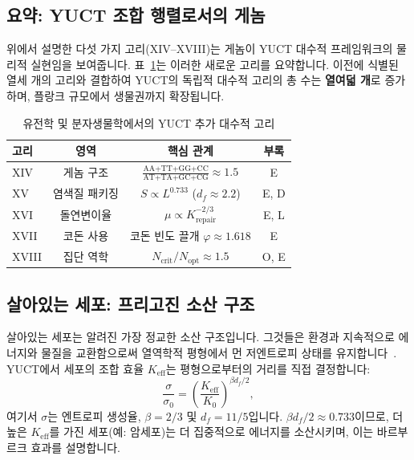 \documentclass[11pt,a4paper]{article}
\newcommand{\Keff}{K_{\mathrm{eff}}}
\begin{document}
	\subsection{요약: YUCT 조합 행렬로서의 게놈}
	
	위에서 설명한 다섯 가지 고리(XIV–XVIII)는 게놈이 YUCT 대수적 프레임워크의 물리적 실현임을 보여줍니다. 표~\ref{tab:genetic-loops}는 이러한 새로운 고리를 요약합니다. 이전에 식별된 열세 개의 고리와 결합하여 YUCT의 독립적 대수적 고리의 총 수는 \textbf{열여덟 개}로 증가하며, 플랑크 규모에서 생물권까지 확장됩니다.
	
	\begin{table}[htbp]
		\centering
		\caption{유전학 및 분자생물학에서의 YUCT 추가 대수적 고리}
		\label{tab:genetic-loops}
		\footnotesize
		\begin{tabular}{l c c c}
			\toprule
			\textbf{고리} & \textbf{영역} & \textbf{핵심 관계} & \textbf{부록} \\
			\midrule
			XIV & 게놈 구조 & \(\frac{\text{AA+TT+GG+CC}}{\text{AT+TA+GC+CG}} \approx 1.5\) & E \\
			XV & 염색질 패키징 & \(S \propto L^{0.733}\) (\(d_f \approx 2.2\)) & E, D \\
			XVI & 돌연변이율 & \(\mu \propto K_{\mathrm{repair}}^{-2/3}\) & E, L \\
			XVII & 코돈 사용 & 코돈 빈도 끌개 \(\varphi \approx 1.618\) & E \\
			XVIII & 집단 역학 & \(N_{\mathrm{crit}}/N_{\mathrm{opt}} \approx 1.5\) & O, E \\
			\bottomrule
		\end{tabular}
	\end{table}
	
	\subsection{살아있는 세포: 프리고진 소산 구조}
	\label{subsec:prigogine}
	
	살아있는 세포는 알려진 가장 정교한 소산 구조입니다. 그것들은 환경과 지속적으로 에너지와 물질을 교환함으로써 열역학적 평형에서 먼 저엔트로피 상태를 유지합니다~\cite{Prigogine1977}. YUCT에서 세포의 조합 효율 \(\Keff\)는 평형으로부터의 거리를 직접 결정합니다:
	\begin{equation}
		\frac{\sigma}{\sigma_0} = \left( \frac{\Keff}{K_0} \right)^{\beta d_f / 2},
	\end{equation}
	여기서 \(\sigma\)는 엔트로피 생성율, \(\beta=2/3\) 및 \(d_f=11/5\)입니다. \(\beta d_f / 2 \approx 0.733\)이므로, 더 높은 \(\Keff\)를 가진 세포(예: 암세포)는 더 집중적으로 에너지를 소산시키며, 이는 바르부르크 효과를 설명합니다.
	
\end{document}
